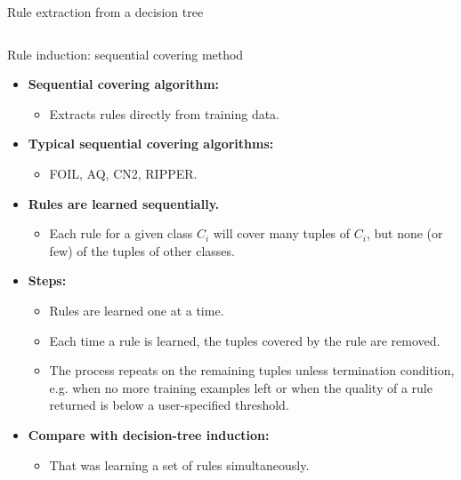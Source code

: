 \documentclass[aspectratio=169,t,table]{beamer}
\begin{document}
{\begin{frame}{Rule extraction from a decision tree}
\begin{columns}
\begin{column}{0.55\textwidth}
        \end{column}
      \end{columns}
    \end{frame}
  }

  {
    \begin{frame}{Rule induction: sequential covering method}
      \begin{itemize}
        \item \textbf{Sequential covering algorithm:}
        \begin{itemize}
          \item Extracts rules directly from training data.
        \end{itemize}
        \item \textbf{Typical sequential covering algorithms:}
        \begin{itemize}
          \item FOIL, AQ, CN2, RIPPER.
        \end{itemize}
        \item \textbf{Rules are learned {\color{airforceblue}sequentially}.}
        \begin{itemize}
          \item Each rule for a given class $C_i$ will cover many tuples of $C_i$, but none (or few) of the tuples of other classes.
        \end{itemize}
        \item \textbf{Steps:}
        \begin{itemize}
          \item Rules are learned one at a time.
          \item Each time a rule is learned, the tuples covered by the rule are removed.
          \item The process repeats on the remaining tuples unless termination condition, e.g. when no more training examples left or when the quality of a rule returned is below a user-specified threshold.
        \end{itemize}
        \item \textbf{Compare with decision-tree induction:}
        \begin{itemize}
          \item That was learning a set of rules simultaneously.
        \end{itemize}
      \end{itemize}
    \end{frame}
  }
\end{document}
